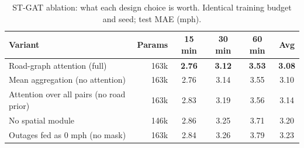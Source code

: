 \begin{table}[t]
\centering
\caption{ST-GAT ablation: what each design choice is worth. Identical training budget and seed; test MAE (mph).}
\label{tab:p2abl_stgat}
\setlength{\tabcolsep}{3.5pt}
\begin{tabular}{lrcccc}
\toprule
Variant & Params & 15 min & 30 min & 60 min & Avg \\
\midrule
Road-graph attention (full) & 163k & \textbf{2.76} & \textbf{3.12} & \textbf{3.53} & \textbf{3.08} \\
Mean aggregation (no attention) & 163k & 2.76 & 3.14 & 3.55 & 3.10 \\
Attention over all pairs (no road prior) & 163k & 2.83 & 3.19 & 3.56 & 3.14 \\
No spatial module & 146k & 2.86 & 3.25 & 3.71 & 3.20 \\
Outages fed as 0 mph (no mask) & 163k & 2.84 & 3.26 & 3.79 & 3.23 \\
\bottomrule
\end{tabular}
\end{table}